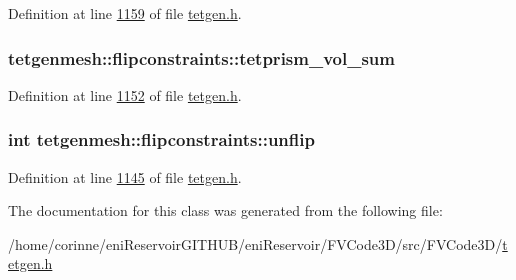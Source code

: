 Definition at line \hyperlink{tetgen_8h_source_l01159}{1159} of file \hyperlink{tetgen_8h_source}{tetgen.\+h}.

\subsubsection[{\texorpdfstring{tetprism\+\_\+vol\+\_\+sum}{tetprism_vol_sum}}]{ tetgenmesh\+::flipconstraints\+::tetprism\+\_\+vol\+\_\+sum}\hypertarget{classtetgenmesh_1_1flipconstraints_a8bb8c96375bd68188384dd8cb34e0a28}{}\label{classtetgenmesh_1_1flipconstraints_a8bb8c96375bd68188384dd8cb34e0a28}


Definition at line \hyperlink{tetgen_8h_source_l01152}{1152} of file \hyperlink{tetgen_8h_source}{tetgen.\+h}.

\subsubsection[{\texorpdfstring{unflip}{unflip}}]{\setlength{\rightskip}{0pt plus 5cm}int tetgenmesh\+::flipconstraints\+::unflip}\hypertarget{classtetgenmesh_1_1flipconstraints_aaa71c48602e685babeca9669f8921b10}{}\label{classtetgenmesh_1_1flipconstraints_aaa71c48602e685babeca9669f8921b10}


Definition at line \hyperlink{tetgen_8h_source_l01145}{1145} of file \hyperlink{tetgen_8h_source}{tetgen.\+h}.



The documentation for this class was generated from the following file\+:\begin{DoxyCompactItemize}
\item 
/home/corinne/eni\+Reservoir\+G\+I\+T\+H\+U\+B/eni\+Reservoir/\+F\+V\+Code3\+D/src/\+F\+V\+Code3\+D/\hyperlink{tetgen_8h}{tetgen.\+h}\end{DoxyCompactItemize}

